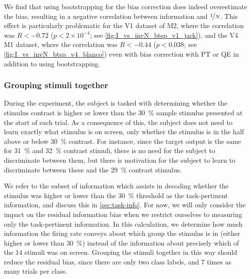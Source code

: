 We find that using bootstrapping for the bias correction does indeed overestimate the bias, resulting in a negative correlation between information and $\nicefrac{1}{N}$.
This effect is particularly problematic for the \ac{V1} dataset of \ac{M2}, where the correlation was $R<-0.72$ ($p < 2 \times 10^{-4}$; see \autoref{fig:I_vs_invN_btsp_v1_jack}), and the \ac{V4} \ac{M1} dataset, where the correlation was $R<-0.44$ ($p<0.038$; see \autoref{fig:I_vs_invN_btsp_v4_blanco}) even with bias correction with \ac{PT} or \ac{QE} in addition to using bootstrapping.


\subsubsection{Grouping stimuli together}
\label{sec:pl_bias_grouping}

During the experiment, the subject is tasked with determining whether the stimulus contrast is higher or lower than the \SI{30}{\percent} sample stimulus presented at the start of each trial.
As a consequence of this, the subject does not need to learn exactly what stimulus is on screen, only whether the stimulus is in the half above or below \SI{30}{\percent} contrast.
For instance, since the target output is the same for \SI{31}{\percent} and \SI{32}{\percent} contrast stimuli, there is no need for the subject to discriminate between them, but there is motivation for the subject to learn to discriminate between these and the \SI{29}{\percent} contrast stimulus.

We refer to the subset of information which assists in decoding whether the stimulus was higher or lower than the \SI{30}{\percent} threshold as the task-pertinent information, and discuss this in \autoref{sec:task-info}.
For now, we will only consider the impact on the residual information bias when we restrict ourselves to measuring only the task-pertinent information.
In this calculation, we determine how much information the firing rate conveys about which group the stimulus is in (either higher or lower than \SI{30}{\percent}) instead of the information about precisely which of the \num{14} stimuli was on screen.
Grouping the stimuli together in this way should reduce the residual bias, since there are only two class labels, and \num{7} times as many trials per class.


